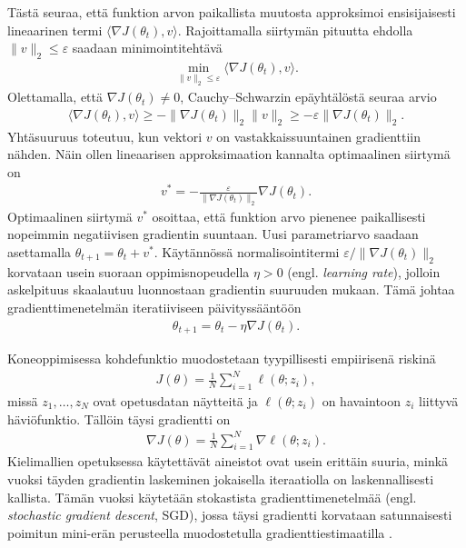 Tästä seuraa, että funktion arvon paikallista muutosta approksimoi
ensisijaisesti lineaarinen termi
\(\langle \nabla J(\theta_t), v\rangle\). Rajoittamalla siirtymän
pituutta ehdolla \(\|v\|_2 \le \varepsilon\) saadaan minimointitehtävä
\begin{align*}
  \min_{\|v\|_2 \le \varepsilon}
  \langle \nabla J(\theta_t), v\rangle.
\end{align*}
Olettamalla, että \(\nabla J(\theta_t) \neq 0\), Cauchy--Schwarzin
epäyhtälöstä seuraa arvio
\begin{align*}
  \langle \nabla J(\theta_t), v\rangle
  \ge
  -
  \|\nabla J(\theta_t)\|_2 \|v\|_2
  \ge
  -
  \varepsilon \|\nabla J(\theta_t)\|_2.
\end{align*}
Yhtäsuuruus toteutuu, kun vektori \(v\) on vastakkaissuuntainen
gradienttiin nähden. Näin ollen lineaarisen approksimaation kannalta
optimaalinen siirtymä on
\begin{align*}
  v^\ast
  =
  -
  \frac{\varepsilon
  }
  {\|\nabla J(\theta_t)\|_2} \nabla J(\theta_t).
\end{align*}
Optimaalinen siirtymä \(v^\ast\) osoittaa, että funktion arvo pienenee
paikallisesti nopeimmin negatiivisen gradientin suuntaan. Uusi parametriarvo
saadaan asettamalla \(\theta_{t+1} = \theta_t + v^\ast\). Käytännössä
normalisointitermi \(\varepsilon / \|\nabla J(\theta_t)\|_2\) korvataan
usein suoraan oppimisnopeudella \(\eta > 0\) (engl. \emph{learning rate}),
jolloin askelpituus skaalautuu luonnostaan gradientin suuruuden mukaan.
Tämä johtaa gradienttimenetelmän iteratiiviseen päivityssääntöön
\begin{align*}
  \theta_{t+1}
  =
  \theta_t - \eta \nabla J(\theta_t).
\end{align*}

Koneoppimisessa kohdefunktio muodostetaan tyypillisesti empiirisenä
riskinä
\begin{align*}
  J(\theta)
  =
  \frac{1}{N}\sum_{i=1}^N \ell(\theta; z_i),
\end{align*}
missä \(z_1,\dots,z_N\) ovat opetusdatan näytteitä ja
\(\ell(\theta; z_i)\) on havaintoon \(z_i\) liittyvä häviöfunktio.
Tällöin täysi gradientti on
\begin{align*}
  \nabla J(\theta)
  =
  \frac{1}{N}\sum_{i=1}^N
  \nabla \ell(\theta; z_i).
\end{align*}
Kielimallien opetuksessa käytettävät aineistot ovat usein erittäin
suuria, minkä vuoksi täyden gradientin laskeminen jokaisella
iteraatiolla on laskennallisesti kallista. Tämän vuoksi käytetään
stokastista gradienttimenetelmää (engl. \emph{stochastic gradient
descent}, SGD), jossa täysi gradientti
korvataan satunnaisesti poimitun mini-erän perusteella muodostetulla
gradienttiestimaatilla \cite{robbins1951stochastic,bottou1998online,bottou2018optimization}.

